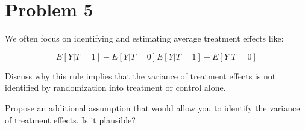 \documentclass[
]{article}
\begin{document}
\newpage

\hypertarget{problem-5}{%
\section{Problem 5}\label{problem-5}}

We often focus on identifying and estimating average treatment effects
like:

\[
E[Y | T = 1] - E[Y | T = 0]E[Y | T = 1] - E[Y | T = 0]
\]

Discuss why this rule implies that the variance of treatment effects is
not identified by randomization into treatment or control alone.

Propose an additional assumption that would allow you to identify the
variance of treatment effects. Is it plausible?
\end{document}
